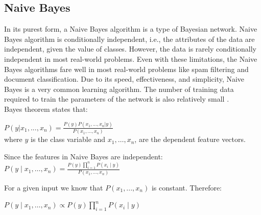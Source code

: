 \subsection{Naive Bayes}
In its purest form, a Naive Bayes algorithm is a type of Bayesian network. Naive Bayes algorithm is conditionally independent, i.e., the attributes of the data are independent, given the value of classes. However, the data is rarely conditionally independent in most real-world problems\cite{zhang2004optimality}. Even with these limitations, the Naive Bayes algorithms fare well in most real-world problems like spam filtering and document classification. Due to its speed, effectiveness, and simplicity, Naive Bayes is a very common learning algorithm. The number of training data required to train the parameters of the network is also relatively small \cite{scikit-learn}. \\
Bayes theorem states that:
\begin{center}
    $P(y|x_{1},...,x_{n}) = \frac{P(y)P(x_{1},...,x_{n}|y)}{P(x_{1},...,x_{n})}$\\
    where $y$ is the class variable and $x_1,\dots,x_n$, are the dependent feature vectors.
\end{center}
\begin{center}
Since the features in Naive Bayes are independent: 
$P(y \mid x_1, \dots, x_n) = \frac{P(y) \prod_{i=1}^{n} P(x_i \mid y)}
                                 {P(x_1, \dots, x_n)}$
\end{center}
For a given input we know that $P(x_{1},...,x_{n})$ is constant. Therefore: 
\begin{center}
$P(y \mid x_1, \dots, x_n) \propto P(y) \prod_{i=1}^{n} P(x_i \mid y)$
\end{center}
